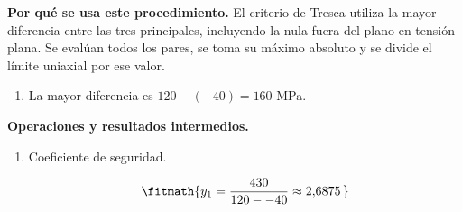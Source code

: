 \noindent\textbf{Por qué se usa este procedimiento.} El criterio de Tresca utiliza la mayor diferencia entre las tres principales, incluyendo la nula fuera del plano en tensión plana. Se evalúan todos los pares, se toma su máximo absoluto y se divide el límite uniaxial por ese valor.

\begin{enumerate}

\item La mayor diferencia es $120 - (-40) = 160$ MPa.

\end{enumerate}

\noindent\textbf{Operaciones y resultados intermedios.}

\begin{enumerate}

\item Coeficiente de seguridad.

\[\fitmath{y_{1}=\frac{430}{120--40}\approx 2{,}6875\,}\]

\end{enumerate}
